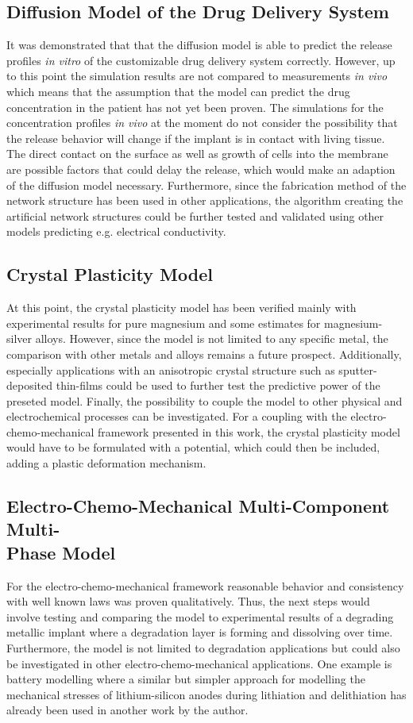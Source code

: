 \subsection*{Diffusion Model of the Drug Delivery System}
It was demonstrated that that the diffusion model is able to predict the release profiles \textit{in vitro} of the customizable drug delivery system correctly. However, up to this point the simulation results are not compared to measurements \textit{in vivo} which means that the assumption that the model can predict the drug concentration in the patient has not yet been proven. The simulations for the concentration profiles \textit{in vivo} at the moment do not consider the possibility that the release behavior will change if the implant is in contact with living tissue. The direct contact on the surface as well as growth of cells into the membrane are possible factors that could delay the release, which would make an adaption of the diffusion model necessary. Furthermore, since the fabrication method of the network structure has been used in other applications\supercite{schutt_electrically_2021,reimers_multifunctional_2023}, the algorithm creating the artificial network structures could be further tested and validated using other models predicting e.g. electrical conductivity. 

\subsection*{Crystal Plasticity Model}
At this point, the crystal plasticity model has been verified mainly with experimental results for pure magnesium and some estimates for magnesium-silver alloys. However, since the model is not limited to any specific metal, the comparison with other metals and alloys remains a future prospect. Additionally, especially applications with an anisotropic crystal structure such as sputter-deposited thin-films could be used to further test the predictive power of the preseted model. Finally, the possibility to couple the model to other physical and electrochemical processes can be investigated. For a coupling with the electro-chemo-mechanical framework presented in this work, the crystal plasticity model would have to be formulated with a potential, which could then be included, adding a plastic deformation mechanism.  

\subsection*{Electro-Chemo-Mechanical Multi-Component Multi-\\Phase Model}
For the electro-chemo-mechanical framework reasonable behavior and consistency with well known laws was proven qualitatively. Thus, the next steps would involve testing and comparing the model to experimental results of a degrading metallic implant where a degradation layer is forming and dissolving over time. Furthermore, the model is not limited to degradation applications but could also be investigated in other electro-chemo-mechanical applications. One example is battery modelling where a similar but simpler approach for modelling the mechanical stresses of lithium-silicon anodes during lithiation and delithiation has already been used in another work by the author. 